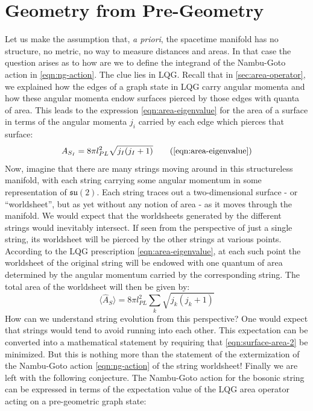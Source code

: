 \documentclass{ws-mpla}
\newcommand{\mf}[1]{\mathfrak{#1}}
\newcommand{\expect}[1]{\langle #1\rangle}
\begin{document}
\section{Geometry from Pre-Geometry}\label{sec:pregeom-2}

Let us make the assumption that, \emph{a priori}, the spacetime manifold has no structure, no metric, no way to measure distances and areas. In that case the question arises as to how are we to define the integrand of the Nambu-Goto action in \eqref{eqn:ng-action}. The clue lies in LQG. Recall that in \autoref{sec:area-operator}, we explained how the edges of a graph state in LQG carry angular momenta and how these angular momenta endow surfaces pierced by those edges with quanta of area. This leads to the expression \eqref{eqn:area-eigenvalue} for the area of a surface in terms of the angular momenta $ j_i $ carried by each edge which pierces that surface:
\begin{equation}\label{eqn:surface-area}
	A_{S_I} = 8\pi l^2_{PL} \sqrt{j_I (j_I + 1)} \tag{\ref{eqn:area-eigenvalue}}
\end{equation}
Now, imagine that there are many strings moving around in this structureless manifold, with each string carrying some angular momentum in some representation of $ \mf{su}(2) $. Each string traces out a two-dimensional surface - or ``worldsheet'', but as yet without any notion of area - as it moves through the manifold. We would expect that the worldsheets generated by the different strings would inevitably intersect. If seen from the perspective of just a single string, its worldsheet will be pierced by the other strings at various points. According to the LQG prescription \eqref{eqn:area-eigenvalue}, at each such point the worldsheet of the original string will be endowed with one quantum of area determined by the angular momentum carried by the corresponding string. The total area of the worldsheet will then be given by:
\begin{equation}\label{eqn:surface-area-2}
		\expect{\hat A_S} = 8 \pi l_{PL}^2 \sum_k \sqrt{ j_k (j_k + 1)}
\end{equation}
How can we understand string evolution from this perspective? One would expect that strings would tend to avoid running into each other. This expectation can be converted into a mathematical statement by requiring that \eqref{eqn:surface-area-2} be minimized. But this is nothing more than the statement of the extermization of the Nambu-Goto action \eqref{eqn:ng-action} of the string worldsheet! Finally we are left with the following conjecture. The Nambu-Goto action for the bosonic string can be expressed in terms of the expectation value of the LQG area operator acting on a pre-geometric graph state:
\end{document}
